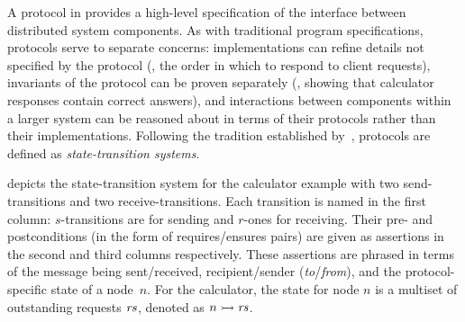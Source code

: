A protocol in \disel provides a high-level specification of the interface
between distributed system components.
%
As with traditional program specifications, \disel protocols serve to
separate concerns: implementations can refine details not specified by
the protocol (\eg, the order in which to respond to client requests),
invariants of the protocol can be proven separately (\eg, showing that
calculator responses contain correct answers), and interactions
between components within a larger system can be reasoned about in
terms of their protocols rather than their implementations.
%
Following the tradition established by~\citet{Lamport:CN78}, \disel
protocols are defined as \emph{state-transition systems}.

 depicts the state-transition system for the
calculator example with two send-transitions and two
receive-transitions.
%
Each transition is named in the first column: $s$-transitions are for
sending and $r$-ones for receiving. Their pre- and postconditions
(in the form of requires/ensures pairs) are given as assertions in the
second and third columns respectively.
%
These assertions are phrased in terms of the message being
sent/received, recipient/sender (\emph{to}/\emph{from}), and the
protocol-specific state of a node~$n$.
%
For the calculator, the state for node $n$ is a multiset of
outstanding requests $\mathit{rs}$, denoted as $n \ppts{} \Rs$.


